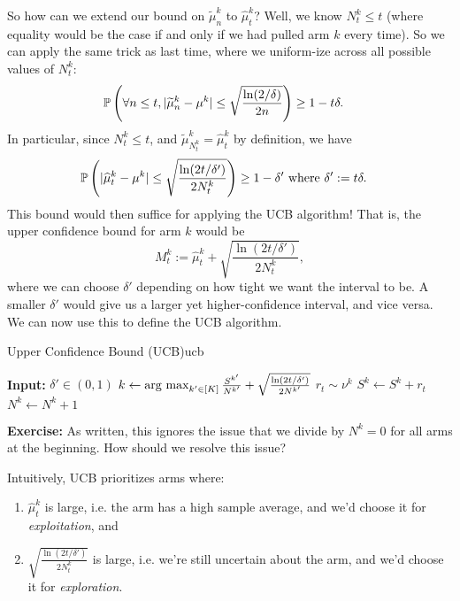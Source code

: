 \documentclass[\main/main]{subfiles}
\begin{document}
So how can we extend our bound on $\tilde\mu^k_n$ to $\hat \mu^k_t$? Well, we know $N^k_t \le t$ (where equality would be the case if and only if we had pulled arm $k$ every time). So we can apply the same trick as last time, where we uniform-ize across all possible values of $N^k_t$:
\begin{align*}
    \P\left( \forall n \le t, |\tilde \mu^k_n - \mu^k | \le \sqrt{\frac{\ln(2/\delta)}{2n}} \right) & \ge 1-t\delta.
\end{align*}
In particular, since $N^k_t \le t$, and $\tilde \mu^k_{N^k_t} = \hat \mu^k_t$ by definition, we have
\begin{align*}
    \P\left( |\hat \mu^k_t - \mu^k | \le \sqrt{\frac{\ln(2t/\delta')}{2N^k_t}} \right) & \ge 1-\delta' \text{ where } \delta' := t \delta.
\end{align*}
This bound would then suffice for applying the UCB algorithm! That is, the upper confidence bound for arm $k$ would be \[ M^k_t := \hat \mu^k_t + \sqrt{\frac{\ln(2t/\delta')}{2N^k_t}}, \] where we can choose $\delta'$ depending on how tight we want the interval to be. A smaller $\delta'$ would give us a larger yet higher-confidence interval, and vice versa. We can now use this to define the UCB algorithm.

\begin{definition}{Upper Confidence Bound (UCB)}{ucb}
    \begin{algorithmic}
        \State \textbf{Input:} $\delta' \in (0, 1)$
        \State $k \gets \argmax_{k' \in [K]} \frac{S^{k'}}{N^{k'}} + \sqrt{\frac{\ln(2t/\delta')}{2 N^{k'}}}$
        \State $r_t \sim \nu^k$
        \State $S^k \gets S^k + r_t$
        \State $N^k \gets N^k + 1$
        \EndFor
    \end{algorithmic}
\end{definition}

\textbf{Exercise:} As written, this ignores the issue that we divide by $N^k = 0$ for all arms at the beginning. How should we resolve this issue?

Intuitively, UCB prioritizes arms where:

\begin{enumerate}
    \item $\hat \mu^k_t$ is large, i.e. the arm has a high sample average, and we'd choose it for \emph{exploitation}, and
    \item $\sqrt{\frac{\ln(2t/\delta')}{2N^k_t}}$ is large, i.e. we're still uncertain about the arm, and we'd choose it for \emph{exploration}.
\end{enumerate}
\end{document}
